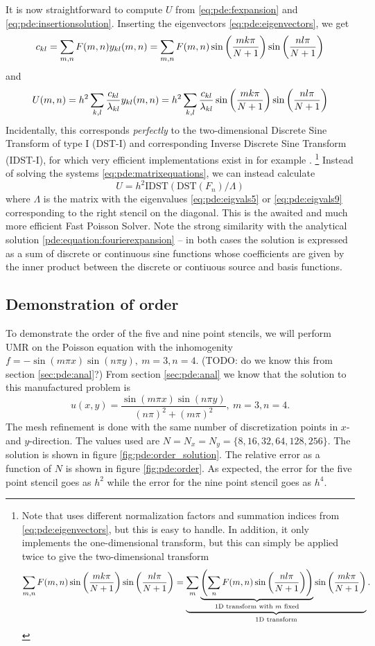 It is now straightforward to compute $U$ from \ref{eq:pde:fexpansion} and \ref{eq:pde:insertionsolution}.
Inserting the eigenvectors \ref{eq:pde:eigenvectors}, we get
$$
c_{kl} = \sum_{m,n} F(m,n) y_{kl}(m,n) 
       = \sum_{m,n} F(m,n) \sin \left( \frac{mk\pi}{N+1} \right) \sin \left( \frac{nl\pi}{N+1} \right)
$$
and
$$
U(m,n) = h^2 \sum_{k,l} \frac{c_{kl}}{\lambda_{kl}} y_{kl}(m,n) 
       = h^2 \sum_{k,l} \frac{c_{kl}}{\lambda_{kl}} \sin \left( \frac{mk\pi}{N+1} \right) \sin \left( \frac{nl\pi}{N+1} \right)
$$
Incidentally, this corresponds \emph{perfectly} to the two-dimensional Discrete Sine Transform of type I (DST-I) and corresponding Inverse Discrete Sine Transform (IDST-I), for which very efficient implementations exist in for example \cite{scipy_dst}.
\footnote{
	Note that \cite{scipy_dst} uses different normalization factors and summation indices from \ref{eq:pde:eigenvectors}, but this is easy to handle.
	In addition, it only implements the one-dimensional transform, but this can simply be applied twice to give the two-dimensional transform
	$$
		\sum_{m,n} F(m,n) \sin \left( \frac{mk\pi}{N+1} \right) \sin \left( \frac{nl\pi}{N+1} \right) 
		= \underbrace{\sum_m \underbrace{\left(\sum_n F(m,n) \sin\left(\frac{nl\pi}{N+1}\right)\right)}_{\text{1D transform with $m$ fixed}} \sin\left(\frac{mk\pi}{N+1}\right)}_{\text{1D transform}}.
	$$
}
Instead of solving the systems \ref{eq:pde:matrixequations}, we can instead calculate
\begin{equation*}
U = h^2 \text{IDST}(\text{DST}(F_n) / \Lambda)
\end{equation*}
where $\Lambda$ is the matrix with the eigenvalues \ref{eq:pde:eigvals5} or \ref{eq:pde:eigvals9} corresponding to the right stencil on the diagonal.
This is the awaited and much more efficient Fast Poisson Solver.
Note the strong similarity with the analytical solution \ref{pde:equation:fourierexpansion} -- in both cases the solution is expressed as a sum of discrete or continuous sine functions whose coefficients are given by the inner product between the discrete or contiuous source and basis functions.

\subsection{Demonstration of order}
To demonstrate the order of the five and nine point stencils, we will perform UMR on the Poisson equation with the inhomogenity $f = -\sin(m \pi x)\sin(n \pi y), ~m=3, n=4$.
(TODO: do we know this from section \ref{sec:pde:anal}?)
From section \ref{sec:pde:anal} we know that the solution to this manufactured problem is
$$
u(x, y) =
\frac{
  \sin(m \pi x)\sin(n \pi y)
}{
  (n\pi)^2 + (m\pi)^2
}
, ~m=3, n=4.
$$
The mesh refinement is done with the same number of discretization points in $x$- and $y$-direction.
The values used are $N = N_x = N_y = \{8, 16, 32, 64, 128, 256\}$.
The solution is shown in figure \ref{fig:pde:order_solution}.
The relative error as a function of $N$ is shown in figure \ref{fig:pde:order}.
As expected, the error for the five point stencil goes as $h^2$ while the error for the nine point stencil goes as $h^4$.


